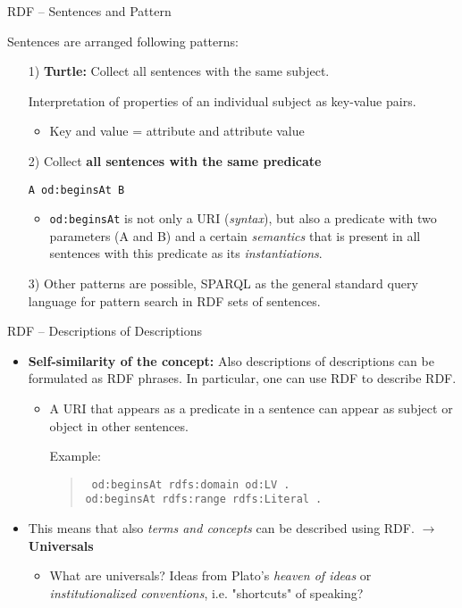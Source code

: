 \documentclass{beamer}
\begin{document}
\begin{frame}{RDF -- Sentences and Pattern}
  
Sentences are arranged following patterns:
\begin{itemize}
\item[1)] \textbf{Turtle:} Collect all sentences with the same subject.
  
  Interpretation of properties of an individual subject as key-value pairs.
  \begin{itemize}
  \item Key and value = attribute and attribute value
  \end{itemize}
\item[2)] Collect \textbf{all sentences with the same predicate}
  \begin{center}\tt    A od:beginsAt B  \end{center}
  \begin{itemize}
  \item \texttt{od:beginsAt} is not only a URI (\emph{syntax}), but also a
    predicate with two parameters (A and B) and a certain \emph{semantics}
    that is present in all sentences with this predicate as its
    \emph{instantiations}.
  \end{itemize}
\item[3)] Other patterns are possible, SPARQL as the general standard
  query language for pattern search in RDF sets of sentences.
\end{itemize}
\end{frame}
\begin{frame}{RDF -- Descriptions of Descriptions}
\begin{itemize}
\item \textbf{Self-similarity of the concept:} Also descriptions of
  descriptions can be formulated as RDF phrases. In particular, one can use
  RDF to describe RDF.
  \begin{itemize}
  \item A URI that appears as a predicate in a sentence can appear as subject
    or object in other sentences.
  
    Example:
    \begin{quote}\tt      
      od:beginsAt rdfs:domain od:LV .\\
      od:beginsAt rdfs:range rdfs:Literal .
    \end{quote}
  \end{itemize}
\item This means that also \emph{terms and concepts} can be described using
  RDF. $\to$ \textbf{Universals}
  \begin{itemize}
  \item What are universals? Ideas from Plato's \emph{heaven of ideas} or
    \emph{institutionalized conventions}, i.e. "shortcuts" of speaking? 
  \end{itemize}
\end{itemize}
\end{frame}
\end{document}
